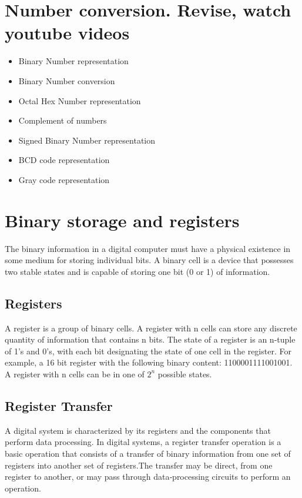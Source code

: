 \section{Number conversion. Revise, watch youtube videos}    
\begin{itemize}
    \item Binary Number representation
    \item Binary Number conversion
    \item Octal Hex Number representation        
    \item Complement of numbers
    \item Signed Binary Number representation
    \item BCD code representation
    \item Gray code representation
\end{itemize}

\section{Binary storage and registers}
The binary information in a digital computer must have a physical existence in some medium for storing individual bits. A binary cell is a device that possesses two stable states and is capable of storing one bit (0 or 1) of information.

\subsection{Registers} 
A register is a group of binary cells. A register with n cells can store any discrete quantity of information that contains n bits.  The state of a register is an n‐tuple of 1’s and 0’s, with each bit designating the state of one cell in the register. For example, a 16 bit register with the following binary content: 1100001111001001. A register with n cells can be in one of $2^{n}$ possible states.

\subsection{Register Transfer}
A digital system is characterized by its registers and the components that perform data processing. In digital systems, a register transfer operation is a basic operation that consists of a transfer of binary information from one set of registers into another set of registers.The transfer may be direct, from one register to another, or may pass through data‐processing circuits to perform an operation.




